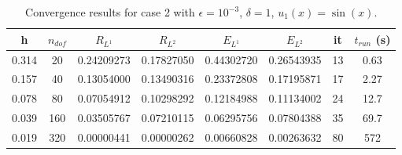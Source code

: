 \documentclass[11pt]{amsart}   	%
\theoremstyle{plain}
\numberwithin{equation}{section}
\begin{document}
\begin{table}[H]
    \centering
    \caption{Convergence results for case 2 with $\epsilon=10^{-3}$, $\delta=1$, $u_1(x)=\sin(x)$.}%
    \begin{tabular}{|c|c||c|c||c|c||c|c|}
    \hline
    h & $n_{dof}$ & $R_{L^1}$ & $R_{L^2} $  & $E_{L^1}$ & $E_{L^2}$ & it & $t_{run}$ (s)
    \\ \hline
    0.314 & 20 & 0.24209273 & 0.17827050 & 0.44302720 & 0.26543935 & 13 & 0.63
    \\ \hline
    0.157 & 40 & 0.13054000 & 0.13490316 & 0.23372808 & 0.17195871 & 17 & 2.27
    \\ \hline
    0.078 & 80 & 0.07054912 & 0.10298292 & 0.12184988 & 0.11134002 & 24 & 12.7
    \\ \hline
    0.039 & 160 & 0.03505767 &0.07210115 & 0.06295756 &  0.07804388& 35 & 69.7    
    \\ \hline
    0.019 & 320 & 0.00000441 & 0.00000262 & 0.00660828 &0.00263632 & 80 &  572
    \\ \hline  
    \end{tabular}
    \label{tab:num_case_2}
\end{table}


\end{document}
